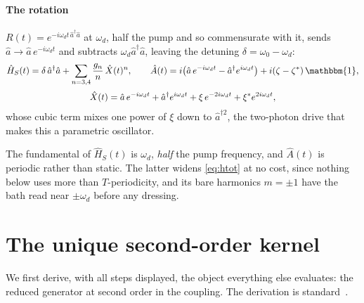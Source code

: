 \documentclass[a4paper,11pt]{article}
\newcommand{\id}{\mathbbm{1}}
\begin{document}
\begin{example}
\paragraph{The rotation}
$R(t) = e^{-i\omega_d t\,\hat a^\dagger\hat a}$ at $\omega_d$, half the pump and so commensurate with it, sends $\hat a\to\hat a\,e^{-i\omega_d t}$ and subtracts $\omega_d\hat a^\dagger\hat a$, leaving the detuning $\delta = \omega_0-\omega_d$:
\begin{equation}\label{eq:kpo-hs}
  \begin{gathered}
  \hat H_S(t) = \delta\,\hat a^\dagger\hat a + \sum_{n=3,4}\frac{g_n}{n}\,\hat X(t)^n,
  \qquad
  \hat A(t) = i\big(\hat a\,e^{-i\omega_d t} - \hat a^\dagger e^{i\omega_d t}\big) + i(\zeta-\zeta^*)\,\id,\\[2pt]
  \hat X(t) = \hat a\,e^{-i\omega_d t} + \hat a^\dagger e^{i\omega_d t}
  + \xi\,e^{-2i\omega_d t} + \xi^*e^{2i\omega_d t},
  \end{gathered}
\end{equation}
whose cubic term mixes one power of $\xi$ down to $\hat a^{\dagger2}$, the two-photon drive that makes this a parametric oscillator.

The fundamental of $\hat H_S(t)$ is $\omega_d$, \emph{half} the pump frequency, and $\hat A(t)$ is periodic rather than static. The latter widens \eqref{eq:htot} at no cost, since nothing below uses more than $T$-periodicity, and its bare harmonics $m=\pm1$ have the bath read near $\pm\omega_d$ before any dressing.
\end{example}

\section{The unique second-order kernel}\label{sec:kernel}

We first derive, with all steps displayed, the object everything else evaluates: the reduced generator at second order in the coupling. The derivation is standard~\cite{Breuer2007}.
\end{document}

